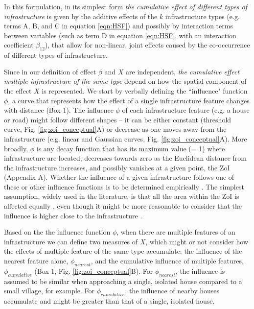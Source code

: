 \documentclass[titlepage]{article}
\begin{document}
In this formulation, in its simplest form \textit{the cumulative effect of different types of infrastructure} is given by the additive effects of the $k$ infrastructure types (e.g. terms A, B, and C in equation \ref{eqn:HSF}) and possibly by interaction terms between variables (such as term D in equation \ref{eqn:HSF}, with an interaction coefficient $\beta_{12}$), that allow for non-linear, joint effects caused by the co-occurrence of different types of infrastructure. 

Since in our definition of effect $\beta$ and $X$ are independent, \textit{the cumulative effect multiple infrastructure of the same type} depend on how the spatial component of the effect $X$ is represented. We start by verbally defining the ``influence" function $\phi$, a curve that represents how the effect of a single infrastructure feature changes with distance (Box 1). The influence $\phi$ of each infrastructure feature (e.g. a house or road) might follow different shapes -- it can be either constant (threshold curve, Fig. \ref{fig:zoi_conceptual}A) or decrease as one moves away from the infrastructure (e.g. linear and Gaussian curves, Fig. \ref{fig:zoi_conceptual}A). More broadly, $\phi$ is any decay function that has its maximum value (= 1) where infrastructure are located, decreases towards zero as the Euclidean distance from the infrastructure increases, and possibly vanishes at a given point, the ZoI (Appendix A). Whether the influence of a given infrastructure follows one of these or other influence functions is to be determined empirically \citep{miguet_how_2017}. The simplest assumption, widely used in the literature, is that all the area within the ZoI is affected equally \citep[e.g][]{quinonezpinon_design_2007}, even though it might be more reasonable to consider that the influence is higher close to the infrastructure \citep[][]{skarin_out_2018, zeller_multi-level_2017}. 

Based on the the influence function $\phi$, when there are multiple features of an infrastructure we can define two measures of $X$, which might or not consider how the effects of multiple feature of the same type accumulate: the influence of the nearest feature alone, $\phi_{nearest}$, and the cumulative influence of multiple features, $\phi_{cumulative}$ (Box 1, Fig. \ref{fig:zoi_conceptual}B). For $\phi_{nearest}$, the influence is assumed to be similar when approaching a single, isolated house compared to a small village, for example. For $\phi_{cumulative}$, the influence of nearby houses accumulate and might be greater than that of a single, isolated house.
\end{document}
